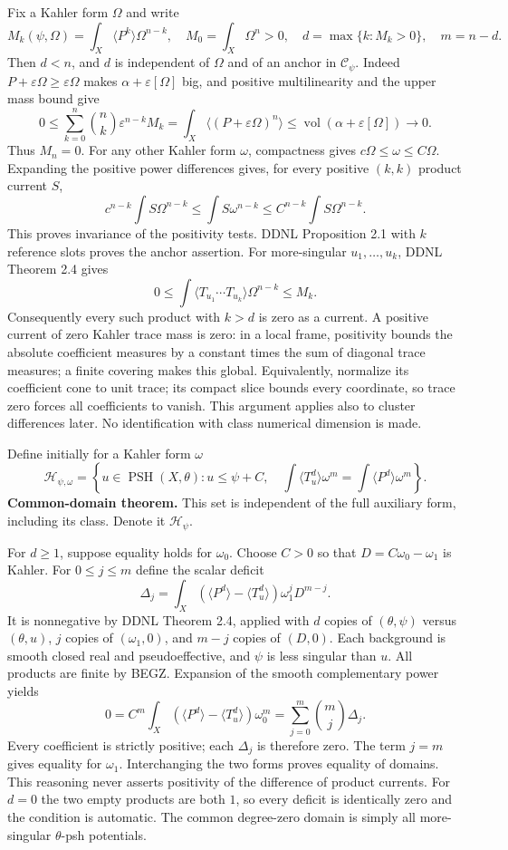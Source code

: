 \documentclass[
  11pt,
]{article}
\begin{document}
Fix a Kahler form \(\Omega\) and write \[
M_k(\psi,\Omega)=\int_X\langle P^k\rangle\Omega^{n-k},\quad M_0=\int_X\Omega^n>0,
\quad d=\max\{k:M_k>0\},\quad m=n-d.
\] Then \(d<n\), and \(d\) is independent of \(\Omega\) and of an anchor
in \(\mathcal C_\psi\). Indeed
\(P+\varepsilon\Omega\geq\varepsilon\Omega\) makes
\(\alpha+\varepsilon[\Omega]\) big, and positive multilinearity and the
upper mass bound give \[
0\leq\sum_{k=0}^n\binom nk\varepsilon^{n-k}M_k
=\int_X\langle(P+\varepsilon\Omega)^n\rangle
\leq\operatorname{vol}(\alpha+\varepsilon[\Omega])\longrightarrow0.
\] Thus \(M_n=0\). For any other Kahler form \(\omega\), compactness
gives \(c\Omega\leq\omega\leq C\Omega\). Expanding the positive power
differences gives, for every positive \((k,k)\) product current \(S\),
\[
c^{n-k}\int S\Omega^{n-k}\leq\int S\omega^{n-k}\leq C^{n-k}\int S\Omega^{n-k}.
\] This proves invariance of the positivity tests. DDNL Proposition 2.1
with \(k\) reference slots proves the anchor assertion. For
more-singular \(u_1,\ldots,u_k\), DDNL Theorem 2.4 gives \[
0\leq\int\langle T_{u_1}\cdots T_{u_k}\rangle\Omega^{n-k}\leq M_k.
\] Consequently every such product with \(k>d\) is zero as a current. A
positive current of zero Kahler trace mass is zero: in a local frame,
positivity bounds the absolute coefficient measures by a constant times
the sum of diagonal trace measures; a finite covering makes this global.
Equivalently, normalize its coefficient cone to unit trace; its compact
slice bounds every coordinate, so trace zero forces all coefficients to
vanish. This argument applies also to cluster differences later. No
identification with class numerical dimension is made.

Define initially for a Kahler form \(\omega\) \[
\mathcal H_{\psi,\omega}=\left\{u\in\operatorname{PSH}(X,\theta):u\leq\psi+C,
\quad\int\langle T_u^d\rangle\omega^m=\int\langle P^d\rangle\omega^m\right\}.
\] \textbf{Common-domain theorem.} This set is independent of the full
auxiliary form, including its class. Denote it \(\mathcal H_\psi\).

For \(d\geq1\), suppose equality holds for \(\omega_0\). Choose \(C>0\)
so that \(D=C\omega_0-\omega_1\) is Kahler. For \(0\leq j\leq m\) define
the scalar deficit \[
\Delta_j=\int_X(\langle P^d\rangle-\langle T_u^d\rangle)\omega_1^jD^{m-j}.
\] It is nonnegative by DDNL Theorem 2.4, applied with \(d\) copies of
\((\theta,\psi)\) versus \((\theta,u)\), \(j\) copies of
\((\omega_1,0)\), and \(m-j\) copies of \((D,0)\). Each background is
smooth closed real and pseudoeffective, and \(\psi\) is less singular
than \(u\). All products are finite by BEGZ. Expansion of the smooth
complementary power yields \[
0=C^m\int_X(\langle P^d\rangle-\langle T_u^d\rangle)\omega_0^m
=\sum_{j=0}^m\binom mj\Delta_j.
\] Every coefficient is strictly positive; each \(\Delta_j\) is
therefore zero. The term \(j=m\) gives equality for \(\omega_1\).
Interchanging the two forms proves equality of domains. This reasoning
never asserts positivity of the difference of product currents. For
\(d=0\) the two empty products are both \(1\), so every deficit is
identically zero and the condition is automatic. The common degree-zero
domain is simply all more-singular \(\theta\)-psh potentials.
\end{document}
